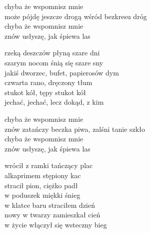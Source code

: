 
\begin{text}
    chyba że wspomnisz mnie\\
    może pójdę jeszcze drogą wśród bezkresu dróg\\
    chyba że wspomnisz mnie\\
    znów usłyszę, jak śpiewa las

    rzeką deszczów płyną szare dni\\
    szarym nocom śnią się szare sny\\
    jakiś dworzec, bufet, papierosów dym\\
    czwarta rano, dręczony tłum\\
    stukot kół, tępy stukot kół\\
    jechać, jechać, lecz dokąd, z kim

    chyba że wspomnisz mnie\\
    znów zatańczy beczka piwa, zalśni tanie szkło\\
    chyba że wspomnisz mnie\\
    znów usłyszę, jak śpiewa las

    wrócił z ramki tańczący plac\\
    alkaprimem stępiony kac\\
    stracił pion, ciężko padł\\
    w poduszek miękki śnieg\\
    w klatce baru straciłem dzień\\
    nowy w twarzy zamieszkał cień\\
    w życie włączył się wsteczny bieg
\end{text}
\begin{chord}

\end{chord}